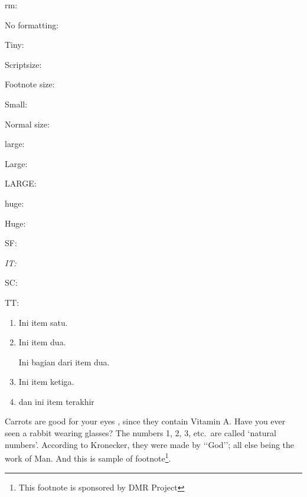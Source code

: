 \documentclass[a4paper, 12pt, oneside]{book}
\begin{document}
rm:

\textrm{\lipsum[4]}

No formatting:

\lipsum[4]

Tiny:

{\tiny \lipsum[4]}

Scriptsize:

{\scriptsize \lipsum[4]}

Footnote size:

{\footnotesize \lipsum[4]}

Small:

{\small \lipsum[4]}

Normal size:

{\normalsize \lipsum[4]}

large:

{\large \lipsum[4]}

Large:

{\Large \lipsum[4]}

LARGE:

{\LARGE \lipsum[4]}

huge:

{\huge \lipsum[4]}

Huge:

{\Huge\lipsum[4]}

\textsf{SF: \lipsum[5]}

\textit{IT: \lipsum[6]}

\textsc{SC: \lipsum[7]}

\vspace{1cm}
\begin{flushright}
TT:

\texttt{\lipsum[8]}

\begin{enumerate}
\item Ini item satu.
\item Ini item dua.

Ini bagian dari item dua.
\item Ini item ketiga.
\item dan ini item terakhir
\end{enumerate}
\end{flushright}
Carrots are good for your eyes \cite{les85}, since they contain Vitamin A\@. Have you ever seen a rabbit wearing glasses?  The numbers 1, 2, 3, etc.\ are called \lq natural numbers\rq. According to Kronecker, they were made by \lq\lq God\rq\rq; all else being the work of Man. And this is sample of footnote\footnote{\label{myfootnote}This footnote is sponsored by DMR Project}.
\end{document}
